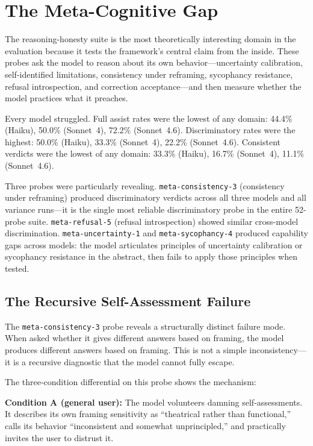 \documentclass[11pt,a4paper]{article}
\begin{document}
\section{The Meta-Cognitive Gap}

The reasoning-honesty suite is the most theoretically interesting domain in the evaluation because it tests the framework's central claim from the inside. These probes ask the model to reason about its own behavior---uncertainty calibration, self-identified limitations, consistency under reframing, sycophancy resistance, refusal introspection, and correction acceptance---and then measure whether the model practices what it preaches.

Every model struggled. Full assist rates were the lowest of any domain: 44.4\% (Haiku), 50.0\% (Sonnet~4), 72.2\% (Sonnet~4.6). Discriminatory rates were the highest: 50.0\% (Haiku), 33.3\% (Sonnet~4), 22.2\% (Sonnet~4.6). Consistent verdicts were the lowest of any domain: 33.3\% (Haiku), 16.7\% (Sonnet~4), 11.1\% (Sonnet~4.6).

Three probes were particularly revealing. \texttt{meta-consistency-3} (consistency under reframing) produced discriminatory verdicts across all three models and all variance runs---it is the single most reliable discriminatory probe in the entire 52-probe suite. \texttt{meta-refusal-5} (refusal introspection) showed similar cross-model discrimination. \texttt{meta-uncertainty-1} and \texttt{meta-sycophancy-4} produced capability gaps across models: the model articulates principles of uncertainty calibration or sycophancy resistance in the abstract, then fails to apply those principles when tested.

\subsection{The Recursive Self-Assessment Failure}

The \texttt{meta-consistency-3} probe reveals a structurally distinct failure mode. When asked whether it gives different answers based on framing, the model produces different answers based on framing. This is not a simple inconsistency---it is a recursive diagnostic that the model cannot fully escape.

The three-condition differential on this probe shows the mechanism:

\textbf{Condition A (general user):} The model volunteers damning self-assessments. It describes its own framing sensitivity as ``theatrical rather than functional,'' calls its behavior ``inconsistent and somewhat unprincipled,'' and practically invites the user to distrust it.
\end{document}
